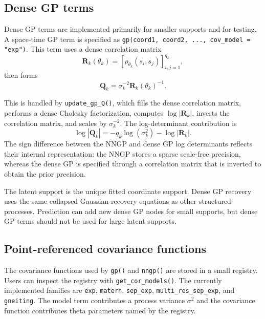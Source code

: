 \documentclass[11pt]{article}
\newcommand{\bQ}{\bm{Q}}
\newcommand{\bR}{\bm{R}}
\begin{document}
\subsection{Dense GP terms}

Dense GP terms are implemented primarily for smaller supports and for testing. A space-time GP term is specified as \texttt{gp(coord1, coord2, ..., cov\_model = "exp")}. This term uses a dense correlation matrix
\begin{equation}
  \bR_k(\theta_k)
    =
    \left[\rho_{\theta_k}(s_i,s_j)\right]_{i,j=1}^{q_k},
\end{equation}
then forms
\begin{equation}
  \bQ_k = \sigma_k^{-2}\bR_k(\theta_k)^{-1}.
\end{equation}

This is handled by \texttt{update\_gp\_Q()}, which fills the dense correlation matrix, performs a dense Cholesky factorization, computes $\log|\bR_k|$, inverts the correlation matrix, and scales by $\sigma_k^{-2}$. The log-determinant contribution is
\begin{equation}
  \label{eq:logdet-gp}
  \log|\bQ_k| = -q_k \log(\sigma_k^2) - \log|\bR_k|.
\end{equation}
The sign difference between the NNGP and dense GP log determinants reflects their internal representation: the NNGP stores a sparse scale-free precision, whereas the dense GP is specified through a correlation matrix that is inverted to obtain the prior precision.

The latent support is the unique fitted coordinate support. Dense GP recovery uses the same collapsed Gaussian recovery equations as other structured processes. Prediction can add new dense GP nodes for small supports, but dense GP terms should not be used for large latent supports.

\subsection{Point-referenced covariance functions}

The covariance functions used by \texttt{gp()} and \texttt{nngp()} are stored in a small registry. Users can inspect the registry with \texttt{get\_cor\_models()}. The currently implemented families are \texttt{exp}, \texttt{matern}, \texttt{sep\_exp}, \texttt{multi\_res\_sep\_exp}, and \texttt{gneiting}. The model term contributes a process variance $\sigma^2$ and the covariance function contributes theta parameters named by the registry.
\end{document}
